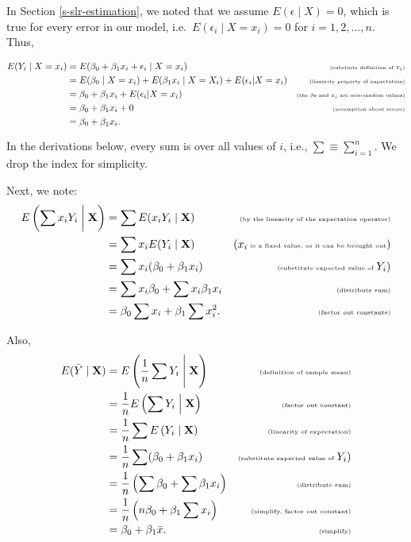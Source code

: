 \documentclass[
]{book}
\theoremstyle{definition}
\theoremstyle{definition}
\theoremstyle{definition}
\theoremstyle{definition}
\theoremstyle{remark}
\begin{document}
In Section \ref{s-slr-estimation}, we noted that we assume \(E(\epsilon \mid X)=0\), which is true for every error in our model, i.e.~\(E(\epsilon_i \mid X = x_i) = 0\) for \(i=1,2,\ldots,n\). Thus,

\[
\begin{aligned}
E(Y_i\mid X=x_i) &= E(\beta_0 + \beta_1 x_i +\epsilon_i\mid X = x_i) & \tiny\text{(substiute definition of $Y_i$)} \\
&= E(\beta_0\mid X=x_i) + E(\beta_1 x_i \mid X = X_i) +E(\epsilon_i | X=x_i) & \tiny\text{(linearity property of expectation)} \\
&= \beta_0+\beta_1x_i +E(\epsilon_i | X=x_i) & \tiny\text{(the $\beta$s and $x_i$ are non-random values)} \\
&= \beta_0+\beta_1x_i + 0 & \tiny\text{(assumption about errors)} \\
&= \beta_0+\beta_1x_i. &
\end{aligned}
\]

In the derivations below, every sum is over all values of \(i\), i.e., \(\sum \equiv \sum_{i=1}^n\). We drop the index for simplicity.

Next, we note:
\[
\begin{aligned}
E\left(\sum x_iY_i \biggm| \mathbf{X} \right) &= \sum E(x_iY_i \mid \mathbf{X}) &\tiny\text{ (by the linearity of the expectation operator)}\\
&=\sum x_iE(Y_i\mid \mathbf{X})&\tiny(x_i\text{ is a fixed value, so it can be brought out})\\
&=\sum x_i(\beta_0+\beta_1 x_i)&\tiny\text{(substitute expected value of }Y_i)\\
&=\sum x_i\beta_0+\sum x_i\beta_1 x_i&\tiny\text{(distribute sum)}\\
&=\beta_0\sum x_i+\beta_1\sum x_i^2.&\tiny\text{(factor out constants)}
\end{aligned}
\]

Also,
\[
\begin{aligned}
E(\bar Y\mid \mathbf{X})
&= E\left(\frac{1}{n}\sum Y_i\Biggm|\mathbf{X} \right)&\tiny\text{(definition of sample mean)}\\
&= \frac{1}{n}E\left(\sum Y_i \Bigm| \mathbf{X}\right)&\tiny\text{(factor out constant)}\\
&= \frac{1}{n}\sum E\left(Y_i \mid \mathbf{X}\right)&\tiny\text{(linearity of expectation)}\\
&= \frac{1}{n}\sum(\beta_0+\beta_1 x_i)&\tiny\text{(substitute expected value of }Y_i)\\
&= \frac{1}{n}\left(\sum\beta_0+\sum\beta_1 x_i\right)&\tiny\text{(distribute sum)}\\
&= \frac{1}{n}\left(n\beta_0+\beta_1\sum x_i\right)&\tiny\text{(simplify, factor out constant)}\\
&= \beta_0+\beta_1\bar x. &\tiny\text{(simplify)}
\end{aligned}
\]
\end{document}
